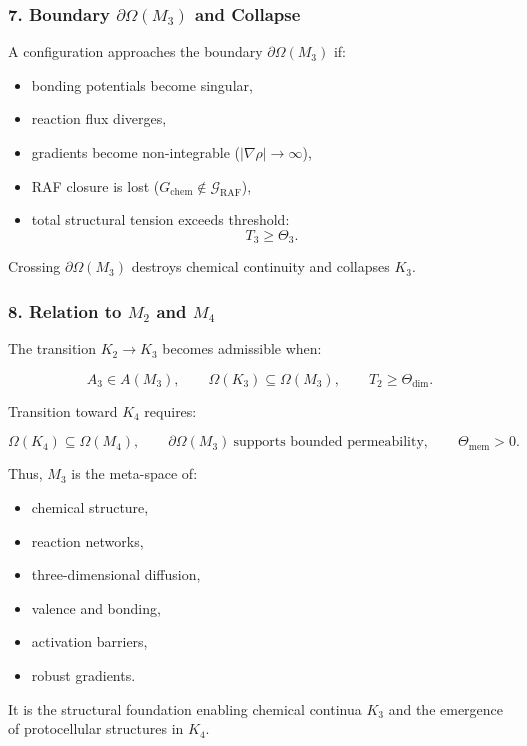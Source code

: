 \subsubsection*{7. Boundary \texorpdfstring{$\partial\Omega(M_3)$}{\partial\Omega(M_3)} and Collapse}

A configuration approaches the boundary $\partial\Omega(M_3)$ if:

\begin{itemize}
    \item bonding potentials become singular,
    \item reaction flux diverges,
    \item gradients become non-integrable ($|\nabla\rho| \to \infty$),
    \item RAF closure is lost ($G_{\mathrm{chem}} \notin \mathcal{G}_{\mathrm{RAF}}$),
    \item total structural tension exceeds threshold:
    \[
    T_3 \ge \Theta_3.
    \]
\end{itemize}

Crossing $\partial\Omega(M_3)$ destroys chemical continuity and collapses $K_3$.

\subsubsection*{8. Relation to \texorpdfstring{$M_2$}{M_2} and \texorpdfstring{$M_4$}{M_4}}

The transition $K_2 \to K_3$ becomes admissible when:

\[
A_3 \in A(M_3),
\qquad
\Omega(K_3) \subseteq \Omega(M_3),
\qquad
T_2 \ge \Theta_{\mathrm{dim}}.
\]

Transition toward $K_4$ requires:

\[
\Omega(K_4) \subseteq \Omega(M_4),
\qquad
\partial\Omega(M_3) \ \text{supports bounded permeability},
\qquad
\Theta_{\mathrm{mem}} > 0.
\]

Thus, $M_3$ is the meta-space of:

\begin{itemize}
    \item chemical structure,
    \item reaction networks,
    \item three-dimensional diffusion,
    \item valence and bonding,
    \item activation barriers,
    \item robust gradients.
\end{itemize}

It is the structural foundation enabling chemical continua $K_3$ and the emergence of protocellular structures in $K_4$.
